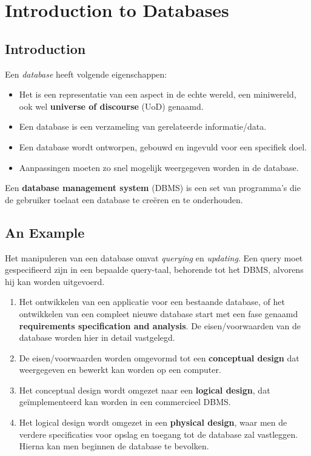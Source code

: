 \chapter{Introduction to Databases}

\section{Introduction}

Een \textit{database} heeft volgende eigenschappen:
\begin{itemize}
 \item Het is een representatie van een aspect in de echte wereld, een miniwereld, ook wel \textbf{universe of discourse} (UoD)  genaamd.
 \item Een database is een verzameling van gerelateerde informatie/data.
 \item Een database wordt ontworpen, gebouwd en ingevuld voor een specifiek doel.
 \item Aanpassingen moeten zo snel mogelijk weergegeven worden in de database.
\end{itemize}
Een \textbf{database management system} (DBMS) is een set van programma's die de gebruiker toelaat een database te cre\"eren en te onderhouden.

\section{An Example}
Het manipuleren van een database omvat \textit{querying} en \textit{updating}.
Een query moet gespecifieerd zijn in een bepaalde query-taal, behorende tot het DBMS, alvorens hij kan worden uitgevoerd.
\begin{enumerate}
 \item Het ontwikkelen van een applicatie voor een bestaande database, of het ontwikkelen van een compleet nieuwe database start met een fase genaamd \textbf{requirements specification and analysis}. De eisen/voorwaarden van de database worden hier in detail vastgelegd.
 \item De eisen/voorwaarden worden omgevormd tot een \textbf{conceptual design} dat weergegeven en bewerkt kan worden op een computer.
 \item Het conceptual design wordt omgezet naar een \textbf{logical design}, dat ge\"implementeerd kan worden in een commercieel DBMS.
 \item Het logical design wordt omgezet in een \textbf{physical design}, waar men de verdere specificaties voor opslag en toegang tot de database zal vastleggen. Hierna kan men beginnen de database te bevolken. 
\end{enumerate}


